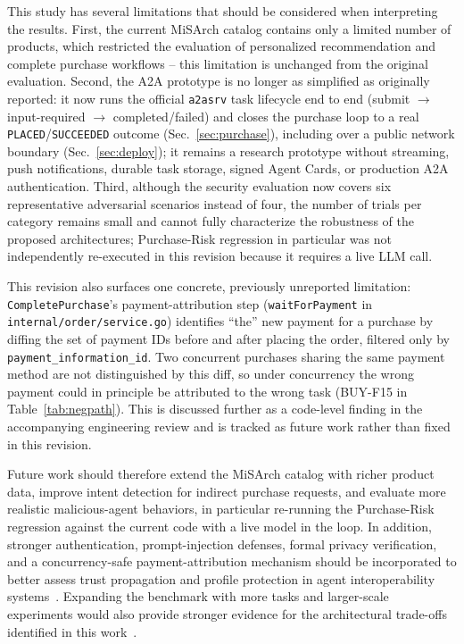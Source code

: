 \documentclass[conference]{IEEEtran}
\begin{document}
This study has several limitations that should be considered when
interpreting the results. First, the current MiSArch catalog contains only a
limited number of products, which restricted the evaluation of personalized
recommendation and complete purchase workflows -- this limitation is
unchanged from the original evaluation. Second, the A2A prototype is no
longer as simplified as originally reported: it now runs the official
\texttt{a2asrv} task lifecycle end to end (submit $\rightarrow$
input-required $\rightarrow$ completed/failed) and closes the purchase loop
to a real \texttt{PLACED}/\texttt{SUCCEEDED} outcome (Sec.~\ref{sec:purchase}),
including over a public network boundary (Sec.~\ref{sec:deploy}); it remains
a research prototype without streaming, push notifications, durable task
storage, signed Agent Cards, or production A2A authentication. Third,
although the security evaluation now covers six representative adversarial
scenarios instead of four, the number of trials per category remains small
and cannot fully characterize the robustness of the proposed architectures;
Purchase-Risk regression in particular was not independently re-executed in
this revision because it requires a live LLM call.

This revision also surfaces one concrete, previously unreported limitation:
\texttt{CompletePurchase}'s payment-attribution step
(\texttt{waitForPayment} in \texttt{internal/order/service.go}) identifies
``the'' new payment for a purchase by diffing the set of payment IDs before
and after placing the order, filtered only by \texttt{payment\_information\_id}.
Two concurrent purchases sharing the same payment method are not
distinguished by this diff, so under concurrency the wrong payment could in
principle be attributed to the wrong task (BUY-F15 in
Table~\ref{tab:negpath}). This is discussed further as a code-level finding
in the accompanying engineering review and is tracked as future work rather
than fixed in this revision.

Future work should therefore extend the MiSArch catalog with richer product
data, improve intent detection for indirect purchase requests, and evaluate
more realistic malicious-agent behaviors, in particular re-running the
Purchase-Risk regression against the current code with a live model in the
loop. In addition, stronger authentication, prompt-injection defenses, formal
privacy verification, and a concurrency-safe payment-attribution mechanism
should be incorporated to better assess trust propagation and profile
protection in agent interoperability systems~\cite{ref5,ref6}. Expanding the
benchmark with more tasks and larger-scale experiments would also provide
stronger evidence for the architectural trade-offs identified in this
work~\cite{ref7}.
\end{document}
